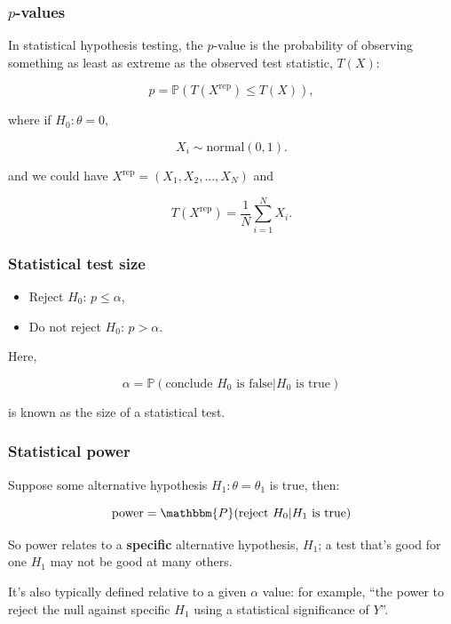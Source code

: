 \documentclass[handout]{beamer}
\begin{document}
\begin{frame}
	\frametitle{$p$-values}
	
	In statistical hypothesis testing, the $p$-value is the probability of observing something as least as extreme as the observed test statistic, $T(X)$:
	
	\begin{equation}
	p = \mathbb{P}(T(X^{\text{rep}}) \leq T(X)),
	\end{equation}
	
	where if $H_0: \theta=0$,
	
	 \begin{equation}
	 X_i \sim \text{normal}(0, 1).
	 \end{equation}
	 
	 and we could have $X^{\text{rep}} = (X_1, X_2, ..., X_N)$ and
	 
	 \begin{equation}
	 T(X^{\text{rep}}) = \frac{1}{N}\sum_{i=1}^{N} X_i.
	 \end{equation}
	
\end{frame}

\begin{frame}
	\frametitle{Statistical test size}
	
	\begin{itemize}
		\item Reject $H_0$: $p \leq \alpha$,
		\item Do not reject $H_0$: $p > \alpha$.
	\end{itemize}
	
	Here,
	
	\begin{equation}
	\alpha = \mathbb{P}(\text{conclude } H_0 \text{ is false}|H_0 \text{ is true})
	\end{equation}
	
	is known as the size of a statistical test.
	
\end{frame}

\begin{frame}
	\frametitle{Statistical power}
	
	Suppose some alternative hypothesis $H_1: \theta = \theta_1$ is true, then:
	 
	 \begin{equation}
	 \text{power} = \mathbbm{P}(\text{reject } H_0| H_1 \text{ is true})
	 \end{equation}
	 
	 
	 So power relates to a \textbf{specific} alternative hypothesis, $H_1$; a test that's good for one $H_1$ may not be good at many others.
	 
	 \vspace{0.5cm}
	 
	 It's also typically defined relative to a given $\alpha$ value: for example, ``the power to reject the null against specific $H_1$ using a statistical significance of $Y$''.
	 
\end{frame}
\end{document}
